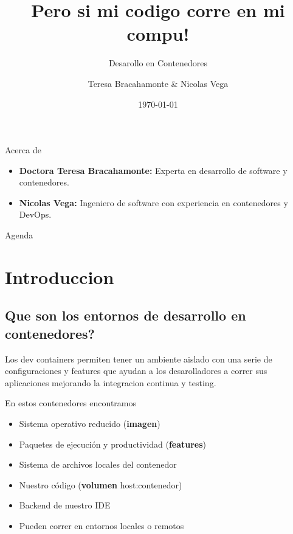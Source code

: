 \documentclass{beamer}
\title{Pero si mi codigo corre en mi compu!}
\subtitle{Desarollo en Contenedores}
\author{Teresa Bracahamonte \& Nicolas Vega}
\date{\today}
\begin{document}
\begin{frame}
  \titlepage
\end{frame}

\begin{frame}{Acerca de}
  \begin{itemize}
    \item \textbf{Doctora Teresa Bracahamonte:} Experta en desarrollo de software y contenedores.
    \item \textbf{Nicolas Vega:} Ingeniero de software con experiencia en contenedores y DevOps.
  \end{itemize}
\end{frame}

\begin{frame}{Agenda}
  \tableofcontents
\end{frame}

\section{Introduccion}
\subsection{Que son los entornos de desarrollo en contenedores?}
\begin{frame}{\subsecname}
  Los dev containers permiten tener un ambiente aislado con una serie de configuraciones 
  y features que ayudan a los desarolladores a correr sus aplicaciones mejorando la 
  integracion continua y testing.
  \begin{block}{En estos contenedores encontramos}
    \begin{itemize}
      \item Sistema operativo reducido (\textbf{imagen})
      \item Paquetes de ejecución y productividad (\textbf{features})
      \item Sistema de archivos locales del contenedor
      \item Nuestro código (\textbf{volumen} host:contenedor)
      \item Backend de nuestro IDE 
      \item Pueden correr en entornos locales o remotos
    \end{itemize}
  \end{block}
\end{frame}
\end{document}
